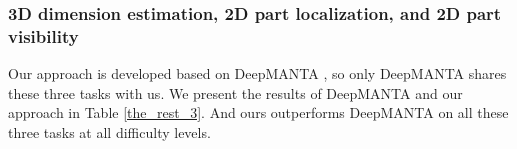 \subsubsection{3D dimension estimation, 2D part localization, and 2D part visibility}
Our approach is developed based on DeepMANTA \cite{DBLP:journals/corr/ChabotCRTC17}, so only DeepMANTA shares these three tasks with us. We present the results of DeepMANTA and our approach in Table \ref{the_rest_3}. And ours outperforms DeepMANTA on all these three tasks at all difficulty levels.

\begin{table}[H]
	\centering
	\caption{Comparison of 3D dimension estimation, 2D part localization, and 2D part visibility on official KITTI dataset for cars (ours is for cars and vans).}
	\label{the_rest_3}
\end{table}